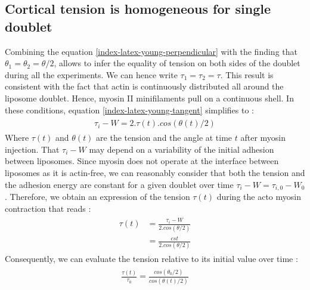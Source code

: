 \documentclass[A4paperpaper,11pt,english]{sphinxmanual}
\begin{document}
\subsection{Cortical tension is homogeneous for single doublet}
\label{index-latex:cortical-tension-is-homogeneous-for-single-doublet}
Combining the equation \eqref{index-latex-young-perpendicular} with the finding that \(\theta_1 = \theta_2 = \theta
/2\), allows to infer the equality of tension on both sides of the doublet during all the
experiments. We can hence write \(\tau_1 = \tau_2 = \tau\). This result is
consistent with the fact that actin is continuously distributed all around the
liposome doublet. Hence, myosin II minifilaments pull on a continuous shell. In
these conditions, equation \eqref{index-latex-young-tangent} simplifies to :
\label{index-latex:equation-eq3}\begin{gather}
\begin{split}\tau_i - W = 2.\tau(t).cos(\theta(t)/2)\end{split}\label{index-latex-eq3}
\end{gather}
Where \(\tau(t)\) and \(\theta(t)\) are the tension and the angle at
time \(t\)  after myosin injection. That
\(\tau_i-W\) may depend on a variability of the initial adhesion between
liposomes. Since myosin does not operate at the interface between liposomes as
it is actin-free, we can reasonably consider that both the tension and
the adhesion energy are constant for a given doublet over time
\(\tau_i-W = \tau_{i,0}-W_0\).
Therefore, we obtain an expression of the tension \(\tau(t)\) during the acto myosin contraction that reads :
\label{index-latex:equation-eqtime}\begin{gather}
\begin{split}\tau(t) &= \frac{ \tau_i - W }{2.cos(\theta/2)}\\
        &= \frac{ cst           }{2.cos(\theta/2)}\end{split}\label{index-latex-eqtime}
\end{gather}
Consequently, we can evaluate the tension relative to its initial value over time :
\label{index-latex:equation-eqa402a}\begin{gather}
\begin{split}\frac{ \tau(t) }{\tau_0} = \frac{cos(\theta_0/2)}{cos(\theta(t)/2)}\end{split}\label{index-latex-eqa402a}
\end{gather}
\end{document}
